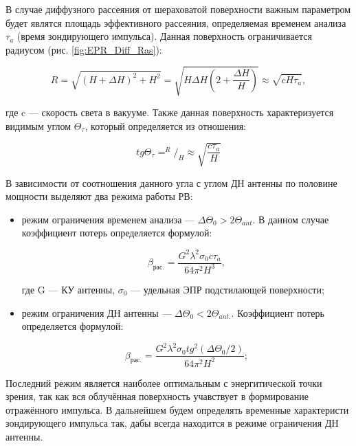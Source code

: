 \documentclass[utf8x, 14pt, oneside, a4paper]{article}
\begin{document}
			В случае диффузного рассеяния от шераховатой поверхности важным параметром будет являтся площадь эффективного рассеяния, определяемая временем анализа $\tau_{a}$ (время зондирующего импульса). Данная поверхность ограничивается радиусом (рис. \ref{fig:EPR_Diff_Ras}):
			
			\begin{equation}
				R=\sqrt{(H+\Delta H)^{2}+H^{2}}=\sqrt{H\Delta H(2+\frac{\Delta H}{H})}\approx\sqrt{cH\tau_{a}},
			\end{equation}
		
			где c --- скорость света в вакууме. Также данная поверхность характеризуется видимым углом $\Theta_{\tau}$, который определяется из отношения:
		
			\begin{equation}
				tg\Theta_{\tau}=^{R}/_{H}\approx\sqrt{\frac{c\tau_{a}}{H}}
			\end{equation}
		
			В зависимости от соотношения данного угла с углом ДН антенны по половине мощности выделяют два режима работы РВ:
			
			\begin{itemize}
				\item режим ограничения временем анализа --- $\Delta\Theta_{0}>2\Theta_{ant}$. В данном случае коэффициент потерь определяется формулой:
				
				\begin{equation}
					\beta_{\text{рас.}}=\frac{G^{2}\lambda^{2}\sigma_{0}c\tau_{a}}{64\pi^{2}H^{3}},
				\end{equation}
			
				где G --- КУ антенны, $\sigma_{0}$ --- удельная ЭПР подстилающей поверхности;
				
				\item режим ограничения ДН антенны --- $\Delta\Theta_{0}<2\Theta_{ant.}$. Коэффициент потерь определяется формулой:
				
				\begin{equation}
					\beta_{\text{рас.}}=\frac{G^{2}\lambda^{2}\sigma_{0}tg^{2}(\Delta\Theta_{0}/2)}{64\pi^{2}H^{2}};
				\end{equation}
			\end{itemize}
		
			Последний режим является наиболее оптимальным с энергитической точки зрения, так как вся облучённая поверхность учавствует в формирование отражённого импульса. В дальнейшем будем определять временные характеристи зондирующего импульса так, дабы всегда находится в режиме ограничения ДН антенны.
			
\end{document}
